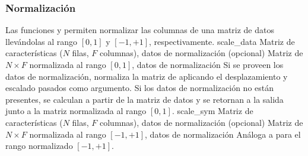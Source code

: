 %
\subsubsection{Normalización}
%
Las funciones  y  permiten normalizar
las columnas de una matriz de datos llevándolas al rango $[0,1]$ y
$[-1,+1]$, respectivamente.
%
\funcentry
    {scale\_data}
    {Matriz de características ($N$ filas, $F$ columnas), datos de
      normalización (opcional)}
    {Matriz de $N\times{}F$ normalizada al rango $[0,1]$, datos de
      normalización}
    {Si se proveen los datos de normalización, normaliza la matriz de
       aplicando el desplazamiento y escalado pasados como
      argumento.
      Si los datos de normalización no están presentes, se calculan a
      partir de la matriz de datos y se retornan a la salida junto a la
      matriz normalizada al rango $[0,1]$.}
%
\funcentry
    {scale\_sym}
    {Matriz de características ($N$ filas, $F$ columnas), datos de
      normalización (opcional)}
    {Matriz de $N\times{}F$ normalizada al rango $[-1,+1]$, datos de
      normalización}
    {Análoga a  para el rango normalizado $[-1,+1]$.}
%
